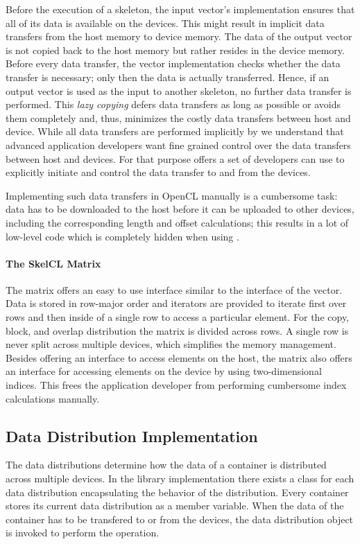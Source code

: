 Before the execution of a skeleton, the input vector's implementation ensures that all of its data is available on the devices.
This might result in implicit data transfers from the host memory to device memory.
The data of the output vector is not copied back to the host memory but rather resides in the device memory.
Before every data transfer, the vector implementation checks whether the data transfer is necessary;
only then the data is actually transferred.
Hence, if an output vector is used as the input to another skeleton, no further data transfer is performed.
This \emph{lazy copying} defers data transfers as long as possible or avoids them completely and, thus, minimizes the costly data transfers between host and device.
While all data transfers are performed implicitly by \SkelCL we understand that advanced application developers want fine grained control over the data transfers between host and devices.
For that purpose \SkelCL offers a set of \APIs developers can use to explicitly initiate and control the data transfer to and from the devices.

Implementing such data transfers in OpenCL manually is a cumbersome task:
data has to be downloaded to the host before it can be uploaded to other devices, including the corresponding length and offset calculations;
this results in a lot of low-level code which is completely hidden when using \SkelCL.


\paragraph{The SkelCL Matrix}
The \SkelCL matrix offers an easy to use interface similar to the interface of the vector.
Data is stored in row-major order and iterators are provided to iterate first over rows and then inside of a single row to access a particular element.
For the copy, block, and overlap distribution the matrix is divided across rows.
A single row is never split across multiple devices, which simplifies the memory management.
Besides offering an interface to access elements on the host, the matrix also offers an interface for accessing elements on the device by using two-dimensional indices.
This frees the application developer from performing cumbersome index calculations manually.










\subsection{Data Distribution Implementation}
\label{section:skelcl-library:distribution}
The data distributions determine how the data of a container is distributed across multiple devices.
In the \SkelCL library implementation there exists a class for each data distribution encapsulating the behavior of the distribution.
Every container stores its current data distribution as a member variable.
When the data of the container has to be transfered to or from the devices, the data distribution object is invoked to perform the operation.

